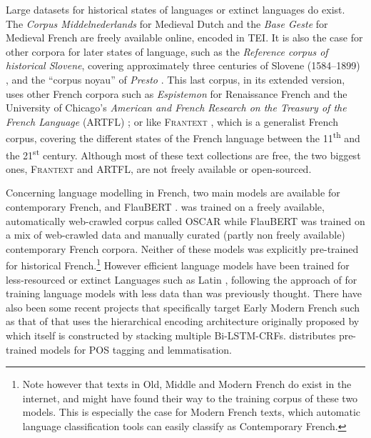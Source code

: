 Large datasets for historical states of languages or  extinct languages do exist. The \emph{Corpus Middelnederlands} for Medieval Dutch \citep{Reenen_corpus_1998} and the \emph{Base Geste} for Medieval French \citep{camps_geste_2016} are freely available online, encoded in TEI. It is also the case for other corpora for later states of language, such as the \textit{Reference corpus of historical Slovene}, covering approximately three centuries of Slovene (1584--1899)  \citep{erjavec_reference_2015}, and the ``corpus noyau'' of \emph{Presto} \citep{presto_corpus_2018}. This last corpus, in its extended version, uses other French corpora such as \textit{Espistemon} for Renaissance French \citep{demonet_epistemon_1998} and the University of Chicago's \emph{American and French Research on the Treasury of the French Language} (ARTFL) \citep{morrissey_artfl_1981}; or like \textsc{Frantext} \citep{atilf_frantext_1998}, which is a generalist French corpus, covering the different states of the French language between the 11\textsuperscript{th} and the 21\textsuperscript{st} century. Although most of these text collections are free, the two biggest ones, \textsc{Frantext} and ARTFL, are not freely available or open-sourced.

Concerning language modelling in French, two main models are available for contemporary French, \camembert \cite{martin-etal-2020-camembert} and FlauBERT \cite{le-etal-2020-flaubert}. \camembert was trained on a freely available, automatically web-crawled corpus called OSCAR \cite{ortiz-suarez-etal-2019-asynchronous,ortiz-suarez-etal-2020-monolingual} while FlauBERT was trained on a mix of web-crawled data and manually curated (partly non freely available) contemporary French corpora. Neither of these models was explicitly pre-trained for historical French.\footnote{Note however that texts in Old, Middle and Modern French do exist in the internet, and might have found their way to the training corpus of these two models. This is especially the case for Modern French texts, which automatic language classification tools can easily classify as Contemporary French.} However efficient language models have been trained for less-resourced or extinct Languages such as Latin \cite{Bamman_latinBErt_2020}, following the approach of  for training language models with less data than was previously thought. There have also been some recent projects that specifically target Early Modern French such as that of \pieextended \cite{clerice-2020-pie} that uses the hierarchical encoding architecture originally proposed by  which itself is constructed by stacking multiple Bi-LSTM-CRFs.  distributes pre-trained models for POS tagging and lemmatisation.

